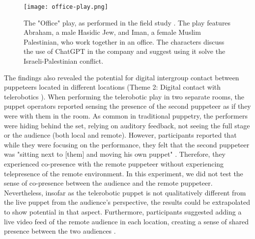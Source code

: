 \documentclass[dissertation,math,vertlayout,pdfa,colorlinks]{aaltoseries}
\begin{document}
\begin{figure}
    \texttt{[image: office-play.png]}
    \caption{The "Office" play, as performed in the field study \cite{peledTeleroboticTheaterOppressed2025}. The play features Abraham, a male Hasidic Jew, and Iman, a female Muslim Palestinian, who work together in an office. The characters discuss the use of ChatGPT in the company and suggest using it solve the Israeli-Palestinian conflict.}
    \label{fig:office-play}
\end{figure}

The findings also revealed the potential for digital intergroup contact between puppeteers located in different locations (Theme 2: Digital contact with telerobotics \cite[p. 16]{peledTeleroboticTheaterOppressed2025}). When performing the telerobotic play in two separate rooms, the puppet operators reported sensing the presence of the second puppeteer as if they were with them in the room. As common in traditional puppetry, the performers were hiding behind the set, relying on auditory feedback, not seeing the full stage or the audience (both local and remote). However, participants reported that while they were focusing on the performance, they felt that the second puppeteer was "sitting next to [them] and moving his own puppet" \cite[p. 16]{peledTeleroboticTheaterOppressed2025}. Therefore, they experienced co-presence with the remote puppeteer without experiencing telepresence of the remote environment. In this experiment, we did not test the sense of co-presence between the audience and the remote puppeteer. Nevertheless, insofar as the telerobotic puppet is not qualitatively different from the live puppet from the audience's perspective, the results could be extrapolated to show potential in that aspect. Furthermore, participants suggested adding a live video feed of the remote audience in each location, creating a sense of shared presence between the two audiences \cite[p. 16]{peledTeleroboticTheaterOppressed2025}.
\end{document}
